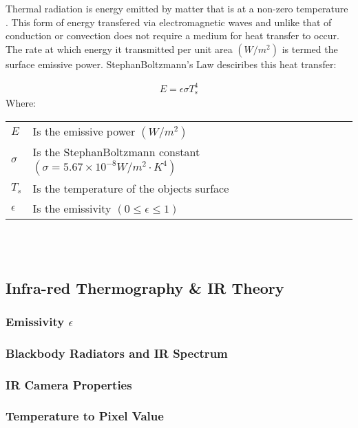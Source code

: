 \documentclass[12pt]{article}
\newcommand{\ts}{\textsuperscript}
\newcommand{\pe}{\vspace{0.3cm}}
\newcommand{\mycite}[1]{\ts{\cite{#1}}}
\begin{document}
Thermal radiation is energy emitted by matter that is at a non-zero temperature \mycite{bergman2011fundamentals}. This form of energy transfered via electromagnetic waves and unlike that of conduction or convection does not require a medium for heat transfer to occur. The rate at which energy it transmitted per unit area $(W/m^2)$ is termed the surface emissive power. StephanBoltzmann's Law desciribes this heat transfer: 
 
\begin{align} \label{StephBoltzSimp}
E = \epsilon \sigma T_s^4
\end{align} 
Where: \\ 
\begin{tabular}{l | l}
	$E$ & Is the emissive power $(W/m^2)$ \\ 
	$\sigma$ & Is the StephanBoltzmann constant $(\sigma = 5.67 \times 10^{-8} W/m^2 \cdot K^4)$ \\ 
	$T_s$ & Is the temperature of the objects surface \\   
	$\epsilon$ & Is the emissivity $(0 \leq \epsilon \leq 1)$ 
\end{tabular}
\\ \pe \\ 


\subsection{Infra-red Thermography \& IR Theory}

\subsubsection{Emissivity $\epsilon$}

\subsubsection{Blackbody Radiators and IR Spectrum}

\subsubsection{IR Camera Properties}

\subsubsection{Temperature to Pixel Value}
\end{document}

